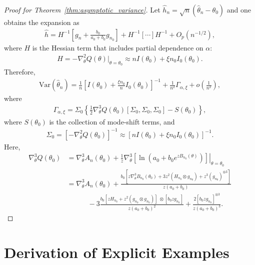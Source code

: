 \documentclass[12pt]{article}
\begin{document}
\begin{proof}[Proof for Theorem~\ref{thm:asymptotic_variance}]
    Let $\hat{h}_n = \sqrt{n}(\hat{\theta}_n - \theta_0)$ and one obtains the expansion as
    \begin{align*}
        \hat{h} = H^{-1}\left[g_n + \frac{b_0}{a_0 + b_0}g_{n_0}\right] + H^{-1}\left[\cdots\right]H^{-1} + O_p(n^{-1/2}),
    \end{align*}
    where $H$ is the Hessian term that includes partial dependence on $\alpha$:
    \begin{align*}
        H = -\nabla_\theta^2Q(\theta) |_{\theta = \theta_0} \approx n I(\theta_0) + \xi n_0 I_0(\theta_0).
    \end{align*}
    Therefore,
    \begin{align*}
        \mathrm{Var}(\hat{\theta}_n) = \frac{1}{n}\left[I(\theta_0) + \frac{\xi n_0}{n}I_0(\theta_0)\right]^{-1} + \frac{1}{n^2}\Gamma_{\alpha,\xi} + o\left(\frac{1}{n^2}\right),
    \end{align*}
    where
    \begin{align*}
        \Gamma_{\alpha,\xi} = \Sigma_0\left\{\frac{1}{2}\nabla_\theta^3Q(\theta_0)[\Sigma_0, \Sigma_0, \Sigma_0] - S(\theta_0)\right\},
    \end{align*}
    where $S(\theta_0)$ is the collection of mode‐shift terms, and
    \begin{align*}
        \Sigma_0 = \left[-\nabla_\theta^2 Q(\theta_0)\right]^{-1} \approx \left[n I(\theta_0) + \xi n_0 I_0(\theta_0)\right]^{-1}.
    \end{align*}
    Here,
    \begin{align*}
        \nabla^3_\theta Q(\theta_0) &= \nabla_\theta^3 A_n(\theta_0) + \left.\frac{1}{z}\nabla_\theta^3\left[\ln \left(a_0 + b_0 e^{z B_{n_0}(\theta)}\right)\right] \right|_{\theta = \theta_0} \\
        &= \nabla_\theta^3 A_n(\theta_0) + \frac{b_0\left[z\nabla^3_\theta B_{n_0}(\theta_0) + 3 z^2(H_{n_0}\otimes g_{n_0}) + z^3(g_{n_0})^{\otimes 3}\right]}{z(a_0 + b_0)} \\
        &\quad\quad\quad - 3\frac{b_0\left[zH_{n_0} + z^2(g_{n_0}\otimes g_{n_0})\right] \ \otimes [b_0 z g_{n_0}]}{z(a_0 + b_0)^2} + \frac{2[b_0 z g_{n_0}]^{\otimes 3}}{z(a_0 + b_0)^3}.
    \end{align*}
\end{proof}

\section{Derivation of Explicit Examples}
\label{sec:derivation_of_explicit_examples}
\end{document}
